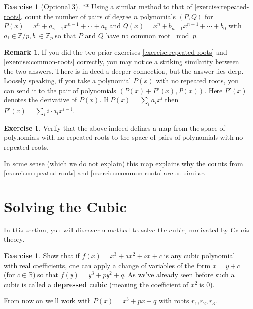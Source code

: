 \documentclass[reqno, 12pt, letter]{article}
\theoremstyle{plain}
\theoremstyle{definition}
\newtheorem{remark}[theorem]{Remark}
\newtheorem{exercise}[theorem]{Exercise}
\theoremstyle{remark}
\numberwithin{equation}{section}
\newcommand\br{{\mathbb R}}
\newcommand\bz{{\mathbb Z}}
\begin{document}
\begin{exercise}[Optional 3]**
	\label{exercise:common-roots}
	Using a similar method to that of \autoref{exercise:repeated-roots},
	count the number of pairs of degree $n$ polynomials $(P,Q)$ for 
	$P(x) = x^n + a_{n-1}x^{n-1} + \cdots + a_0$ and $Q(x) = x^n + b_{n-1}x^{n-1} + \cdots + b_0$
	with $a_i \in \bz/p, b_i \in \bz_p$ so that $P$ and $Q$ have no common root $\bmod p$.
\end{exercise}
\begin{remark}
	\label{remark:}
	If you did the two prior exercises \autoref{exercise:repeated-roots} and \autoref{exercise:common-roots} correctly, you may notice a striking similarity
between the two answers. There is in deed a deeper connection, but the answer lies deep.
Loosely speaking, if you take a polynomial $P(x)$ with no repeated roots, you can send it
to the pair of polynomials $(P(x) + P'(x), P(x))$. Here $P'(x)$ denotes the derivative of $P(x)$.
If $P(x) = \sum_i a_ix^i$ then $P'(x) = \sum_i  i \cdot a_i x^{i-1}$.
\begin{exercise}
	\label{exercise:}
	Verify that the above indeed defines a map
from the space of polynomials with no repeated roots to the
space of pairs of polynomials with no repeated roots.
\end{exercise}

In some sense (which we do not explain) this map explains why the counts from 
\autoref{exercise:repeated-roots} and \autoref{exercise:common-roots} are so similar.
\end{remark}



\newpage
\section{Solving the Cubic}
	In this section, you will discover a method to solve the cubic, motivated by Galois theory.
	
	\begin{exercise}
		\label{exercise:}
		Show that if $f(x) = x^3 + ax^2 +bx +c$ is any cubic polynomial with real coefficients, one can apply
		a change of variables of the form $x = y + c$ (for $c \in \br$)
		so that $f(y) = y^3 + py^2 + q$.
		As we've already seen before such a cubic is called a {\bf depressed cubic} (meaning the coefficient of $x^2$ is $0$).
	\end{exercise}

	From now on we'll work with $P(x) = x^3 + px + q$ with roots $ r_1, r_2, r_3$.
	
\end{document}
